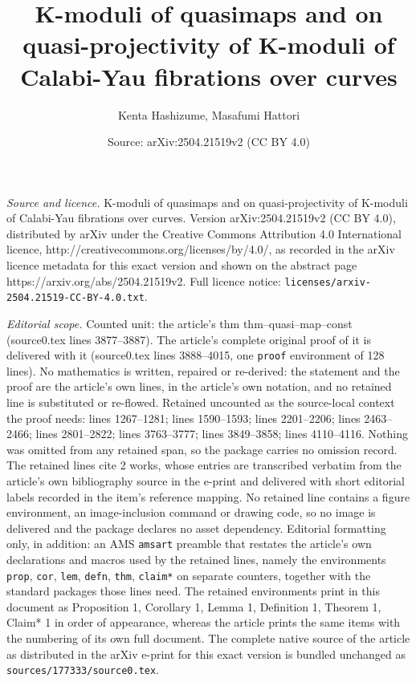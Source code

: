 \documentclass[10pt,a4paper]{amsart}
\title{K-moduli of quasimaps and on quasi-projectivity of K-moduli of Calabi-Yau fibrations over curves}
\author{Kenta Hashizume, Masafumi Hattori}
\date{Source: arXiv:2504.21519v2 (CC BY 4.0)}
\begin{document}
\maketitle

\noindent\emph{Source and licence.} K-moduli of quasimaps and on quasi-projectivity of K-moduli of Calabi-Yau fibrations over curves. Version arXiv:2504.21519v2 (CC BY 4.0), distributed by arXiv under the Creative Commons Attribution 4.0 International licence, http://creativecommons.org/licenses/by/4.0/, as recorded in the arXiv licence metadata for this exact version and shown on the abstract page https://arxiv.org/abs/2504.21519v2. Full licence notice: \texttt{licenses/arxiv-2504.21519-CC-BY-4.0.txt}.\par\smallskip

\noindent\textit{Editorial scope.} Counted unit: the article's thm thm--quasi--map--const (source0.tex lines 3877--3887). The article's complete original proof of it is delivered with it (source0.tex lines 3888--4015, one \texttt{proof} environment of 128 lines). No mathematics is written, repaired or re-derived: the statement and the proof are the article's own lines, in the article's own notation, and no retained line is substituted or re-flowed.  Retained uncounted as the source-local context the proof needs: lines 1267--1281; lines 1590--1593; lines 2201--2206; lines 2463--2466; lines 2801--2822; lines 3763--3777; lines 3849--3858; lines 4110--4116.  Nothing was omitted from any retained span, so the package carries no omission record.  The retained lines cite 2 works, whose entries are transcribed verbatim from the article's own bibliography source in the e-print and delivered with short editorial labels recorded in the item's reference mapping.  No retained line contains a figure environment, an image-inclusion command or drawing code, so no image is delivered and the package declares no asset dependency.  Editorial formatting only, in addition: an AMS \texttt{amsart} preamble that restates the article's own declarations and macros used by the retained lines, namely the environments \texttt{prop}, \texttt{cor}, \texttt{lem}, \texttt{defn}, \texttt{thm}, \texttt{claim*} on separate counters, together with the standard packages those lines need.  The retained environments print in this document as Proposition 1, Corollary 1, Lemma 1, Definition 1, Theorem 1, Claim* 1 in order of appearance, whereas the article prints the same items with the numbering of its own full document.  The complete native source of the article as distributed in the arXiv e-print for this exact version is bundled unchanged as \texttt{sources/177333/source0.tex}.
\end{document}
